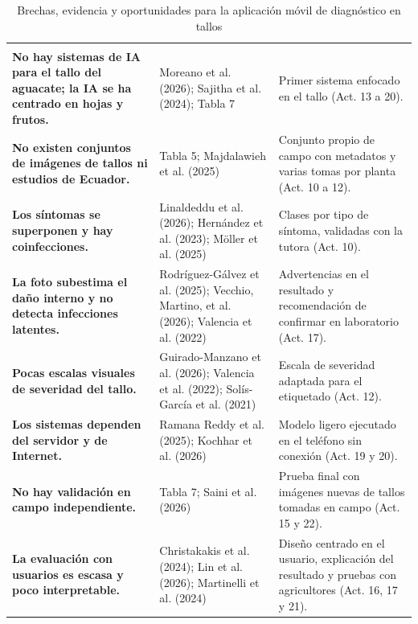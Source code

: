 \documentclass[11pt]{article}
\begin{document}
{\fontsize{8.5}{10.4}\selectfont
\begin{longtable}{|>{\RaggedRight\arraybackslash}p{5.045cm}|>{\RaggedRight\arraybackslash}p{4.516cm}|>{\RaggedRight\arraybackslash}p{5.288cm}|}
\caption{Brechas, evidencia y oportunidades para la aplicación móvil de diagnóstico en tallos}\\
\hline
\rowcolor[HTML]{D9E2F3}
\multicolumn{1}{|>{\centering\arraybackslash}m{5.045cm}|}{\textbf{Brecha}} & \multicolumn{1}{>{\centering\arraybackslash}m{4.516cm}|}{\textbf{Evidencia}} & \multicolumn{1}{>{\centering\arraybackslash}m{5.288cm}|}{\textbf{Oportunidad para el proyecto}} \\ \hline
\endfirsthead
\hline
\rowcolor[HTML]{D9E2F3}
\multicolumn{1}{|>{\centering\arraybackslash}m{5.045cm}|}{\textbf{Brecha}} & \multicolumn{1}{>{\centering\arraybackslash}m{4.516cm}|}{\textbf{Evidencia}} & \multicolumn{1}{>{\centering\arraybackslash}m{5.288cm}|}{\textbf{Oportunidad para el proyecto}} \\ \hline
\endhead
\textbf{No hay sistemas de IA para el tallo del aguacate; la IA se ha centrado en hojas y frutos.} & Moreano et al. (2026); Sajitha et al. (2024); Tabla 7 & Primer sistema enfocado en el tallo (Act. 13 a 20). \\ \hline
\textbf{No existen conjuntos de imágenes de tallos ni estudios de Ecuador.} & Tabla 5; Majdalawieh et al. (2025) & Conjunto propio de campo con metadatos y varias tomas por planta (Act. 10 a 12). \\ \hline
\textbf{Los síntomas se superponen y hay coinfecciones.} & Linaldeddu et al. (2026); Hernández et al. (2023); Möller et al. (2025) & Clases por tipo de síntoma, validadas con la tutora (Act. 10). \\ \hline
\textbf{La foto subestima el daño interno y no detecta infecciones latentes.} & Rodríguez-Gálvez et al. (2025); Vecchio, Martino, et al. (2026); Valencia et al. (2022) & Advertencias en el resultado y recomendación de confirmar en laboratorio (Act. 17). \\ \hline
\textbf{Pocas escalas visuales de severidad del tallo.} & Guirado-Manzano et al. (2026); Valencia et al. (2022); Solís-García et al. (2021) & Escala de severidad adaptada para el etiquetado (Act. 12). \\ \hline
\textbf{Los sistemas dependen del servidor y de Internet.} & Ramana Reddy et al. (2025); Kochhar et al. (2026) & Modelo ligero ejecutado en el teléfono sin conexión (Act. 19 y 20). \\ \hline
\textbf{No hay validación en campo independiente.} & Tabla 7; Saini et al. (2026) & Prueba final con imágenes nuevas de tallos tomadas en campo (Act. 15 y 22). \\ \hline
\textbf{La evaluación con usuarios es escasa y poco interpretable.} & Christakakis et al. (2024); Lin et al. (2026); Martinelli et al. (2024) & Diseño centrado en el usuario, explicación del resultado y pruebas con agricultores (Act. 16, 17 y 21). \\ \hline
\end{longtable}}
\end{document}
